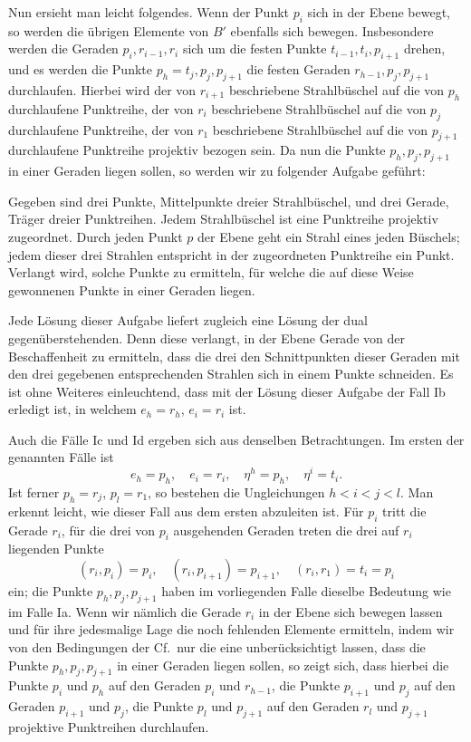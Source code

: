 \documentclass[11pt]{article}
\newcommand{\Cf}{\textup{Cf.}}
\begin{document}
Nun ersieht man leicht folgendes. Wenn der Punkt $p_i$ sich in der Ebene bewegt, so werden die übrigen Elemente von $B'$ ebenfalls sich bewegen. Insbesondere werden die Geraden $p_i,r_{i-1},r_i$ sich um die festen Punkte $t_{i-1},t_i,p_{i+1}$ drehen, und es werden die Punkte $p_h=t_j,p_j,p_{j+1}$ die festen Geraden $r_{h-1},p_j,p_{j+1}$ durchlaufen. Hierbei wird der von $r_{i+1}$ beschriebene Strahlbüschel auf die von $p_h$ durchlaufene Punktreihe, der von $r_i$ beschriebene Strahlbüschel auf die von $p_j$ durchlaufene Punktreihe, der von $r_1$ beschriebene Strahlbüschel auf die von $p_{j+1}$ durchlaufene Punktreihe projektiv bezogen sein. Da nun die Punkte $p_h,p_j,p_{j+1}$ in einer Geraden liegen sollen, so werden wir zu folgender Aufgabe geführt:

Gegeben sind drei Punkte, Mittelpunkte dreier Strahlbüschel, und drei Gerade, Träger dreier Punktreihen. Jedem Strahlbüschel ist eine Punktreihe projektiv zugeordnet. Durch jeden Punkt $p$ der Ebene geht ein Strahl eines jeden Büschels; jedem dieser drei Strahlen entspricht in der zugeordneten Punktreihe ein Punkt. Verlangt wird, solche Punkte zu ermitteln, für welche die auf diese Weise gewonnenen Punkte in einer Geraden liegen.

Jede Lösung dieser Aufgabe liefert zugleich eine Lösung der dual gegenüberstehenden. Denn diese verlangt, in der Ebene Gerade von der Beschaffenheit zu ermitteln, dass die drei den Schnittpunkten dieser Geraden mit den drei gegebenen entsprechenden Strahlen sich in einem Punkte schneiden. Es ist ohne Weiteres einleuchtend, dass mit der Lösung dieser Aufgabe der Fall Ib erledigt ist, in welchem $e_h=r_h$, $e_i=r_i$ ist.

Auch die Fälle Ic und Id ergeben sich aus denselben Betrachtungen. Im ersten der genannten Fälle ist
\[
e_h=p_h,
\quad e_i=r_i,
\quad \eta^h=p_h,
\quad \eta^i=t_i.
\]
Ist ferner $p_h=r_j$, $p_l=r_1$, so bestehen die Ungleichungen $h<i<j<l$. Man erkennt leicht, wie dieser Fall aus dem ersten abzuleiten ist. Für $p_i$ tritt die Gerade $r_i$, für die drei von $p_i$ ausgehenden Geraden treten die drei auf $r_i$ liegenden Punkte
\[
(r_i,p_i)=p_i,
\quad (r_i,p_{i+1})=p_{i+1},
\quad (r_i,r_1)=t_i=p_i
\]
ein; die Punkte $p_h,p_j,p_{j+1}$ haben im vorliegenden Falle dieselbe Bedeutung wie im Falle Ia. Wenn wir nämlich die Gerade $r_i$ in der Ebene sich bewegen lassen und für ihre jedesmalige Lage die noch fehlenden Elemente ermitteln, indem wir von den Bedingungen der \Cf\ nur die eine unberücksichtigt lassen, dass die Punkte $p_h,p_j,p_{j+1}$ in einer Geraden liegen sollen, so zeigt sich, dass hierbei die Punkte $p_i$ und $p_h$ auf den Geraden $p_i$ und $r_{h-1}$, die Punkte $p_{i+1}$ und $p_j$ auf den Geraden $p_{i+1}$ und $p_j$, die Punkte $p_l$ und $p_{j+1}$ auf den Geraden $r_l$ und $p_{j+1}$ projektive Punktreihen durchlaufen.
\end{document}
